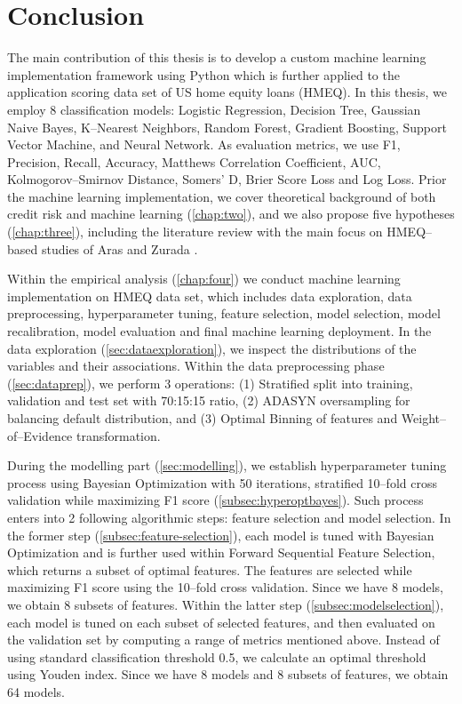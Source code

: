 \chapter{Conclusion}
\label{conclusion}

The main contribution of this thesis is to develop a custom machine learning implementation framework using Python which is further applied to the application scoring data set of US home equity loans (HMEQ).
In this thesis, we employ 8 classification models: Logistic Regression, Decision Tree, Gaussian Naive Bayes, K--Nearest Neighbors, Random Forest, Gradient Boosting, Support Vector Machine, and Neural Network. As evaluation metrics, we use F1, Precision, Recall, Accuracy, Matthews Correlation Coefficient, AUC, Kolmogorov--Smirnov Distance, Somers' D, Brier Score Loss and Log Loss.
Prior the machine learning implementation, we cover theoretical background of both credit risk and machine learning (\autoref{chap:two}), and we also propose five hypotheses (\autoref{chap:three}), including the literature review with the main focus on HMEQ--based studies of Aras \citep{serkan2021bagging} and Zurada \citep{zurada2014classification}.

Within the empirical analysis (\autoref{chap:four}) we conduct machine learning implementation on HMEQ data set, which includes data exploration, data preprocessing, hyperparameter tuning, feature selection, model selection, model recalibration, model evaluation and final machine learning deployment.
In the data exploration (\autoref{sec:dataexploration}), we inspect the distributions of the variables and their associations.
Within the data preprocessing phase (\autoref{sec:dataprep}), we perform 3 operations: (1) Stratified split into training, validation  and test set with 70:15:15 ratio, (2) ADASYN oversampling for balancing default distribution, and (3) Optimal Binning of features and Weight--of--Evidence transformation.

During the modelling part (\autoref{sec:modelling}), we establish hyperparameter tuning process using Bayesian Optimization with 50 iterations, stratified 10--fold cross validation while maximizing F1 score (\autoref{subsec:hyperoptbayes}).
Such process enters into 2 following algorithmic steps: feature selection and model selection.
In the former step (\autoref{subsec:feature-selection}), each model is tuned with Bayesian Optimization and is further used within Forward Sequential Feature Selection, which returns a subset of optimal features. The features are selected while maximizing F1 score using the 10--fold cross validation. Since we have 8 models, we obtain 8 subsets of features.
Within the latter step (\autoref{subsec:modelselection}), each model is tuned on each subset of selected features, and then evaluated on the validation set by computing a range of metrics mentioned above. Instead of using standard classification threshold 0.5, we calculate an optimal threshold using Youden index. Since we have 8 models and 8 subsets of features, we obtain 64 models.

